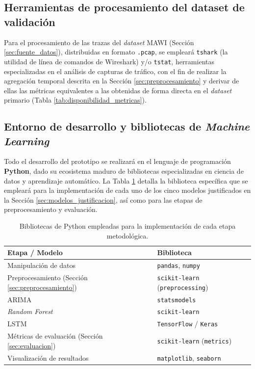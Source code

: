 \documentclass[12pt]{report}
\begin{document}
\subsection*{Herramientas de procesamiento del dataset de validación}

Para el procesamiento de las trazas del \textit{dataset} MAWI (Sección \ref{sec:fuente_datos}), distribuidas en formato \texttt{.pcap}, se empleará \texttt{tshark} (la utilidad de línea de comandos de Wireshark) y/o \texttt{tstat}, herramientas especializadas en el análisis de capturas de tráfico, con el fin de realizar la agregación temporal descrita en la Sección \ref{sec:preprocesamiento} y derivar de ellas las métricas equivalentes a las obtenidas de forma directa en el \textit{dataset} primario (Tabla \ref{tab:disponibilidad_metricas}).

\subsection*{Entorno de desarrollo y bibliotecas de \textit{Machine Learning}}

Todo el desarrollo del prototipo se realizará en el lenguaje de programación \textbf{Python}, dado su ecosistema maduro de bibliotecas especializadas en ciencia de datos y aprendizaje automático. La Tabla \ref{tab:bibliotecas_modelos} detalla la biblioteca específica que se empleará para la implementación de cada uno de los cinco modelos justificados en la Sección \ref{sec:modelos_justificacion}, así como para las etapas de preprocesamiento y evaluación.

\begin{table}[H]
    \centering
    \begin{tabular}{|l|l|}
        \hline
        \textbf{Etapa / Modelo} & \textbf{Biblioteca} \\
        \hline
        Manipulación de datos & \texttt{pandas}, \texttt{numpy} \\
        \hline
        Preprocesamiento (Sección \ref{sec:preprocesamiento}) & \texttt{scikit-learn} (\texttt{preprocessing}) \\
        \hline
        ARIMA & \texttt{statsmodels} \\
        \hline
        \textit{Random Forest}& \texttt{scikit-learn} \\
        \hline
        LSTM & \texttt{TensorFlow} / \texttt{Keras} \\
        \hline
        Métricas de evaluación (Sección \ref{sec:evaluacion}) & \texttt{scikit-learn} (\texttt{metrics}) \\
        \hline
        Visualización de resultados & \texttt{matplotlib}, \texttt{seaborn} \\
        \hline
    \end{tabular}
    \caption{Bibliotecas de Python empleadas para la implementación de cada etapa metodológica.}
    \label{tab:bibliotecas_modelos}
\end{table}
\end{document}
